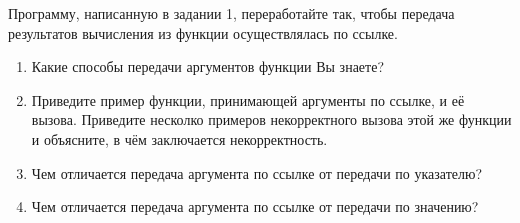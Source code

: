 \labtask

Программу, написанную в задании 1, переработайте так, чтобы передача результатов вычисления из функции осуществлялась по ссылке.

\labworkquestions

\begin{enumerate}
	\item
		Какие способы передачи аргументов функции Вы знаете?
	\item
		Приведите пример функции, принимающей аргументы по ссылке, и её вызова.
		Приведите несколко примеров некорректного вызова этой же функции и объясните, в чём заключается некорректность.
	\item
		Чем отличается передача аргумента по ссылке от передачи по указателю?
	\item
		Чем отличается передача аргумента по ссылке от передачи по значению?
\end{enumerate}



